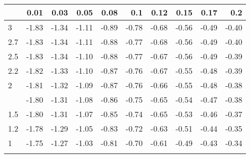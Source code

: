 
\begin{tabular}{lrrrrrrrrr}
\toprule{}
  & 0.01 & 0.03 & 0.05 & 0.08 & 0.1 & 0.12 & 0.15 & 0.17 & 0.2\\
\midrule{}
3 & -1.83 & -1.34 & -1.11 & -0.89 & -0.78 & -0.68 & -0.56 & -0.49 & -0.40\\
2.7 & -1.83 & -1.34 & -1.11 & -0.88 & -0.77 & -0.68 & -0.56 & -0.49 & -0.40\\
2.5 & -1.83 & -1.34 & -1.10 & -0.88 & -0.77 & -0.67 & -0.56 & -0.49 & -0.39\\
2.2 & -1.82 & -1.33 & -1.10 & -0.87 & -0.76 & -0.67 & -0.55 & -0.48 & -0.39\\
2 & -1.81 & -1.32 & -1.09 & -0.87 & -0.76 & -0.66 & -0.55 & -0.48 & -0.38\\
\addlinespace
1.7 & -1.80 & -1.31 & -1.08 & -0.86 & -0.75 & -0.65 & -0.54 & -0.47 & -0.38\\
1.5 & -1.80 & -1.31 & -1.07 & -0.85 & -0.74 & -0.65 & -0.53 & -0.46 & -0.37\\
1.2 & -1.78 & -1.29 & -1.05 & -0.83 & -0.72 & -0.63 & -0.51 & -0.44 & -0.35\\
1 & -1.75 & -1.27 & -1.03 & -0.81 & -0.70 & -0.61 & -0.49 & -0.43 & -0.34\\
\bottomrule{}
\end{tabular}
